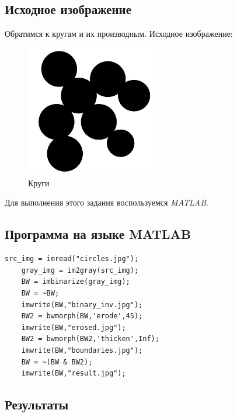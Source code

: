 \subsection{Исходное изображение}

Обратимся к кругам и их производным. Исходное изображение:

\begin{figure}[ht!]
    \centering
    \includegraphics[width=0.5\textwidth]{images/source_images/circles.jpg}
    \caption{Круги}
    \label{img:circles_orig}
\end{figure} 

Для выполнения этого задания воспользуемся \textit{MATLAB}.

\subsection{Программа на языке MATLAB}

\begin{lstlisting}[caption={Исходный код программы для разделения объектов}, label={lst:separation}]
    src_img = imread("circles.jpg");
    gray_img = im2gray(src_img);
    BW = imbinarize(gray_img);
    BW = ~BW;
    imwrite(BW,"binary_inv.jpg");
    BW2 = bwmorph(BW,'erode',45);
    imwrite(BW,"erosed.jpg");
    BW2 = bwmorph(BW2,'thicken',Inf);
    imwrite(BW,"boundaries.jpg");
    BW = ~(BW & BW2);
    imwrite(BW,"result.jpg");
\end{lstlisting}

\subsection{Результаты}
